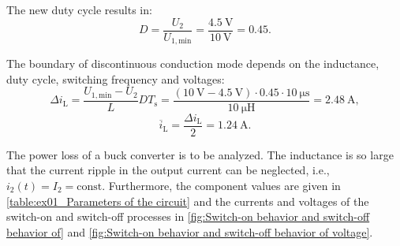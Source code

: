 \begin{solutionblock}
	The new duty cycle results in:
	\begin{equation}
		D= \frac{U_\mathrm{2}}{U_{\mathrm{1,min}}} = \frac{\SI{4.5}{\volt}}{\SI{10}{\volt}} = 0.45.
	\end{equation}
\end{solutionblock}

\begin{solutionblock}
	The boundary of discontinuous conduction mode depends on the inductance, duty cycle, switching frequency and voltages:
	\begin{equation}
		\Delta i_\mathrm{L} = \frac{U_{\mathrm{1,min}} - U_\mathrm{2}}{L} D T_\mathrm{s} = \frac{(\SI{10}{\volt} - \SI{4.5}{\volt}) \cdot 0.45 \cdot \SI{10}{\micro \second}}{\SI{10}{\micro \henry}} = \SI{2.48}{\ampere},
	\end{equation}
	\begin{equation}
		\overline{i}_{\mathrm{L}} = \frac{\Delta i_\mathrm{L}}{2} = \SI{1.24}{\ampere}.
	\end{equation}
\end{solutionblock}


The power loss of a buck converter is to be analyzed. The inductance is so large
that the current ripple in the output current can be neglected, i.e., $ i_{\mathrm{2}}(t) = I_{\mathrm{2}} =\mathrm{const}$. Furthermore, the component values are given in \autoref{table:ex01_Parameters of the circuit} and the currents and voltages of the switch-on and switch-off processes in \autoref{fig:Switch-on behavior and switch-off behavior of} and \autoref{fig:Switch-on behavior and switch-off behavior of voltage}.



